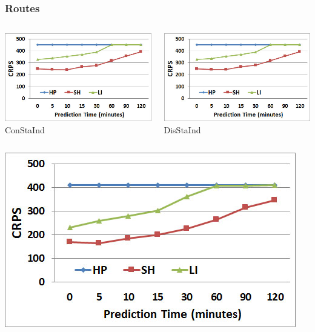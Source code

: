 \documentclass[t]{beamer}
\begin{document}
\begin{frame}\frametitle{Routes}
\vspace{-0.35in}
\begin{columns}
		\begin{center}
			\includegraphics[scale=0.3]{Approaches_ConStaInd.jpg}\\
			ConStaInd
		\end{center}
		\begin{center}
			\includegraphics[scale=0.3]{Approaches_DisStaInd.jpg}\\
			DisStaInd
		\end{center}
\end{columns}
\begin{columns}
		\begin{center}
			\includegraphics[scale=0.3]{Approaches_DisTimInd.jpg}\\

\end{center}
\end{columns}
\end{frame}
\end{document}
